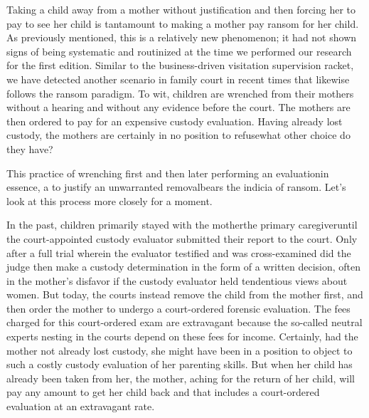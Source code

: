 \vspace{3em}

\vspace{-.5em}

\noindent{}Taking a child away from a mother without justification and
then forcing her to pay to see her child is tantamount to making a mother pay
ransom for her child. As previously mentioned, this is a relatively new
phenomenon; it had not shown signs of being systematic and routinized
at the time we performed our research for the first edition. Similar to the
business-driven visitation supervision racket, we have detected another
scenario in family court in recent times that likewise follows the ransom
paradigm. To wit, children are wrenched from their mothers without a
hearing and without any evidence before the court. The mothers are then
ordered to pay for an expensive custody evaluation. Having already lost
custody, the mothers are certainly in no position to refuse\mdash{}what other
choice do they have? \pfl{}

This practice of wrenching first and then later performing an
evalua\-tion\mdash{}in essence, a  to justify an unwarranted
re\-moval\mdash{}bears the indicia of ransom. Let's look at this process more
closely for a moment. \pfl{}

In the past, children primarily stayed with the mother\mdash{}the primary
caregiver\mdash{}until the court-appointed custody evaluator submitted their
report to the court. Only after a full trial wherein the evaluator testified
and was cross-examined did the judge then make a custody 
determination in the form of a written decision, often in the mother's disfavor if
the custody evaluator held tendentious views about women. But today,
the courts instead remove the child from the mother first, and then
order the mother to undergo a court-ordered forensic evaluation. The
fees charged for this court-ordered exam are extravagant because the
so-called neutral experts nesting in the courts depend on these fees for
income. Certainly, had the mother not already lost custody, she might
have been in a position to object to such a costly custody evaluation of
her parenting skills. But when her child has already been taken from
her, the mother, aching for the return of her child, will pay any amount
to get her child back and that includes a court-ordered evaluation at an
extravagant rate. \pfl{}


